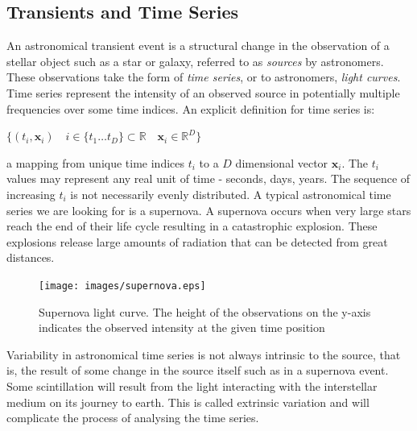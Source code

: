 	\subsection{Transients and Time Series}
	An astronomical transient event is a structural change in the observation of a stellar object such as a star or galaxy, referred to as \emph{sources} by astronomers. These observations take the form of \emph{time series}, or to astronomers, \emph{light curves}. Time series represent the intensity of an observed source in potentially multiple frequencies over some time indices. An explicit definition for time series is:
	\begin{center}
	\begin{math}
		\{(t_i, \mathbf{x}_{i}) \quad i \in \{t_{1} \ldots t_{D}\} \subset \mathbb{R} \quad \mathbf{x}_{i} \in \mathbb{R}^{D} \}
	\end{math}
	\end{center}
	a mapping from unique time indices $t_{i}$ to a $D$ dimensional vector $\mathbf{x}_{i}$. The $t_{i}$ values may represent any real unit of time - seconds, days, years. The sequence of increasing $t_{i}$ is not necessarily evenly distributed. A typical astronomical time series we are looking for is a supernova. A supernova occurs when very large stars reach the end of their life cycle resulting in a catastrophic explosion. These explosions release large amounts of radiation that can be detected from great distances.
	\begin{figure}[ht!]
	\centering
	\texttt{[image: images/supernova.eps]}
	\caption{Supernova light curve. The height of the observations on the y-axis indicates the observed intensity at the given time position}
	\end{figure}
	Variability in astronomical time series is not always intrinsic to the source, that is, the result of some change in the source itself such as in a supernova event. Some scintillation will result from the light interacting with the interstellar medium on its journey to earth. This is called extrinsic variation and will complicate the process of analysing the time series.
